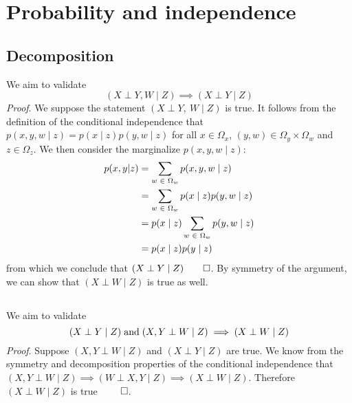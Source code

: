 \documentclass{article}
\newcommand{\s}{\hspace{0.1cm}}
\numberwithin{equation}{section}
\begin{document}
\section{Probability and independence}
\subsection{Decomposition}
We aim to validate
\begin{equation}
        (X \perp Y, W \mid  Z)  \implies (X \perp Y \mid Z)
\end{equation}
\textit{Proof}.  We suppose the statement $(X \perp Y,\ W \mid Z)$ is true. 
It follows from the definition of the conditional independence that
$p(x, y, w \mid z) = p(x\mid z) p(y, w\mid z)$ for all 
$x \in  \Omega_x$, $(y, w) \in \Omega_y \times  \Omega_w$  and $z \in  \Omega_z$.
We then consider the marginalize  $p(x,y,w \mid z)$:
\begin{align*}
        p(x,y|z) &=  \sum_{w\s \in \s \Omega_w}  p(x, y , w \mid z) \\
                 &=  \sum_{w\s \in \s \Omega_w} p(x\mid z)p(y,w \mid z) \\
                 &= p(x \mid z) \sum_{w\s  \in \s  \Omega_w} p(y,w \mid z) \\
                &=  p(x\mid z) p(y\mid  z)
\end{align*}
from which we conclude that  $(X \perp Y \mid Z) \qed$.
By symmetry of the argument,  we can show that ${(X \perp W \mid Z)}$ is true as well.

\subsection{}
We aim to validate 
\begin{equation}\label{eq:1b}
       (X \perp Y \mid Z) \s \text{and} \s (X, Y \perp  W \mid Z) \implies (X \perp W \mid Z)  
\end{equation}
\textit{Proof}. Suppose $(X, Y \perp  W \mid Z)$ and $(X \perp Y \mid Z)$ are true.
We know from the symmetry and decomposition properties of  
the  conditional independence that  
$(X, Y \perp W \mid  Z)  \implies  (W \perp X, Y \mid Z)  \implies  (X \perp  W \mid Z)$.
Therefore $ (X \perp W \mid Z)$ is true $\qed$.
\end{document}
